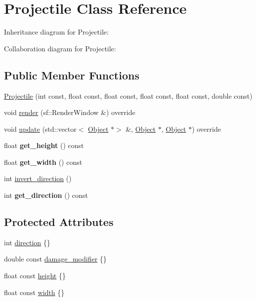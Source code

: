 \hypertarget{classProjectile}{}\section{Projectile Class Reference}
\label{classProjectile}


Inheritance diagram for Projectile\+:


Collaboration diagram for Projectile\+:
\subsection*{Public Member Functions}
\begin{DoxyCompactItemize}
\item 
\hyperlink{classProjectile_a2405b8d7efa8c98ca978e31aa76c48b3}{Projectile} (int const, float const, float const, float const, float const, double const)
\item 
void \hyperlink{classProjectile_aa503768163cf6144328203f56d3866c1}{render} (sf\+::\+Render\+Window \&) override
\item 
void \hyperlink{classProjectile_a4aaeec5eb44bb09058afc96d2a9b5d72}{update} (std\+::vector$<$ \hyperlink{classObject}{Object} $\ast$$>$ \&, \hyperlink{classObject}{Object} $\ast$, \hyperlink{classObject}{Object} $\ast$) override
\item 
\mbox{\label{classProjectile_af7f69a3adff68a71b760afa4a692d756}} 
float {\bfseries get\+\_\+height} () const
\item 
\mbox{\label{classProjectile_a729dbae4880a031705692b7ef6bcc401}} 
float {\bfseries get\+\_\+width} () const
\item 
int \hyperlink{classProjectile_a90a5fdd713db14b83732d9cfc9a0479e}{invert\+\_\+direction} ()
\item 
\mbox{\label{classProjectile_a4be2dc6482bddd1521c9d7937085db6c}} 
int {\bfseries get\+\_\+direction} () const
\end{DoxyCompactItemize}
\subsection*{Protected Attributes}
\begin{DoxyCompactItemize}
\item 
int \hyperlink{classProjectile_a5d30e0f7e8033f0d72fe759a8dd02b30}{direction} \{\}
\item 
double const \hyperlink{classProjectile_a6f2bfbfa611704a2fbc031b7969d6afb}{damage\+\_\+modifier} \{\}
\item 
float const \hyperlink{classProjectile_a4ea221974935c400c17d2acbee33b0ee}{height} \{\}
\item 
float const \hyperlink{classProjectile_a526dd3f231b015203325d5d7a2e89159}{width} \{\}
\end{DoxyCompactItemize}


